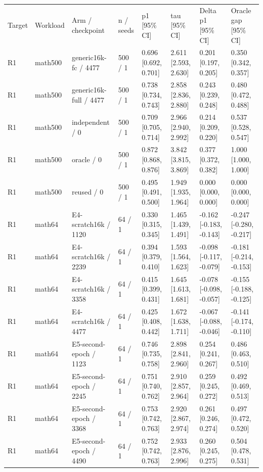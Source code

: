 \begin{tabular}{llllllll}
\hline
Target & Workload & Arm / checkpoint & n / seeds & p1 [95\% CI] & tau [95\% CI] & Delta p1 [95\% CI] & Oracle gap [95\% CI] \\
R1 & math500 & generic16k-fc / 4477 & 500 / 1 & 0.696 [0.692, 0.701] & 2.611 [2.593, 2.630] & 0.201 [0.197, 0.205] & 0.350 [0.342, 0.357] \\
R1 & math500 & generic16k-full / 4477 & 500 / 1 & 0.738 [0.734, 0.743] & 2.858 [2.836, 2.880] & 0.243 [0.239, 0.248] & 0.480 [0.472, 0.488] \\
R1 & math500 & independent / 0 & 500 / 1 & 0.709 [0.705, 0.714] & 2.966 [2.940, 2.992] & 0.214 [0.209, 0.220] & 0.537 [0.528, 0.547] \\
R1 & math500 & oracle / 0 & 500 / 1 & 0.872 [0.868, 0.876] & 3.842 [3.815, 3.869] & 0.377 [0.372, 0.382] & 1.000 [1.000, 1.000] \\
R1 & math500 & reused / 0 & 500 / 1 & 0.495 [0.491, 0.500] & 1.949 [1.935, 1.964] & 0.000 [0.000, 0.000] & 0.000 [0.000, 0.000] \\
R1 & math64 & E4-scratch16k / 1120 & 64 / 1 & 0.330 [0.315, 0.345] & 1.465 [1.439, 1.491] & -0.162 [-0.183, -0.143] & -0.247 [-0.280, -0.217] \\
R1 & math64 & E4-scratch16k / 2239 & 64 / 1 & 0.394 [0.379, 0.410] & 1.593 [1.564, 1.623] & -0.098 [-0.117, -0.079] & -0.181 [-0.214, -0.153] \\
R1 & math64 & E4-scratch16k / 3358 & 64 / 1 & 0.415 [0.399, 0.431] & 1.645 [1.613, 1.681] & -0.078 [-0.098, -0.057] & -0.155 [-0.188, -0.125] \\
R1 & math64 & E4-scratch16k / 4477 & 64 / 1 & 0.425 [0.408, 0.442] & 1.672 [1.638, 1.711] & -0.067 [-0.088, -0.046] & -0.141 [-0.174, -0.110] \\
R1 & math64 & E5-second-epoch / 1123 & 64 / 1 & 0.746 [0.735, 0.758] & 2.898 [2.841, 2.960] & 0.254 [0.241, 0.267] & 0.486 [0.463, 0.510] \\
R1 & math64 & E5-second-epoch / 2245 & 64 / 1 & 0.751 [0.740, 0.762] & 2.910 [2.857, 2.964] & 0.259 [0.245, 0.272] & 0.492 [0.469, 0.513] \\
R1 & math64 & E5-second-epoch / 3368 & 64 / 1 & 0.753 [0.742, 0.763] & 2.920 [2.867, 2.974] & 0.261 [0.246, 0.274] & 0.497 [0.472, 0.520] \\
R1 & math64 & E5-second-epoch / 4490 & 64 / 1 & 0.752 [0.742, 0.763] & 2.933 [2.876, 2.996] & 0.260 [0.245, 0.275] & 0.504 [0.478, 0.531] \\

\end{tabular}
